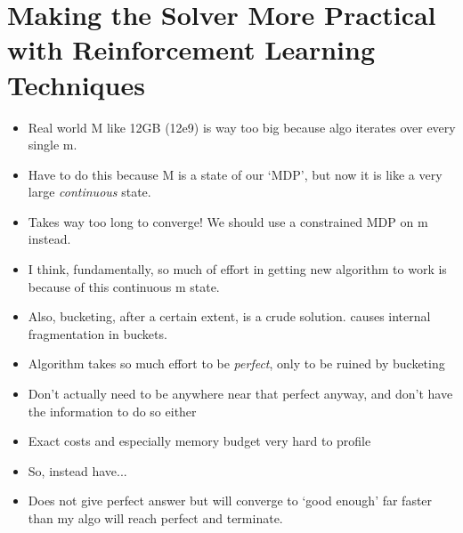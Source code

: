 \section{Making the Solver More Practical with Reinforcement Learning Techniques}
\begin{itemize}[topsep=0.2em]
    \item Real world M like 12GB (12e9) is way too big because algo iterates over every single m.
    \item Have to do this because M is a state of our `MDP', but now it is like a very large \textit{continuous} state.
    \item Takes way too long to converge! We should use a constrained MDP on m instead.
    \item I think, fundamentally, so much of effort in getting new algorithm to work is because of this continuous m state.
    \item Also, bucketing, after a certain extent, is a crude solution. causes internal fragmentation in buckets.
    \item Algorithm takes so much effort to be \textit{perfect}, only to be ruined by bucketing
    \item Don't actually need to be anywhere near that perfect anyway, and don't have the information to do so either
    \item Exact costs and especially memory budget very hard to profile
    \item So, instead have...
    \item Does not give perfect answer but will converge to `good enough' far faster than my algo will reach perfect and terminate.
\end{itemize}